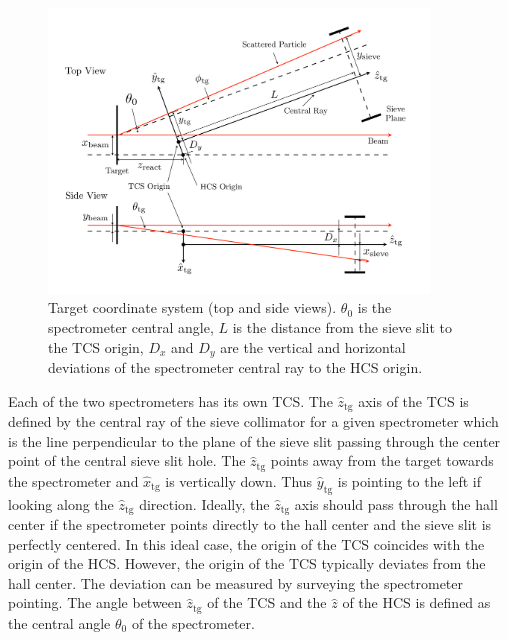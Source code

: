 \begin{figure}[p!]
  \centering
  \includegraphics[width=0.9\textwidth]{figs/TCS.pdf}
  \caption[Target coordinate system.]{Target coordinate system (top and side views). $\theta_0$ is the spectrometer central angle, $L$ is the distance from the sieve slit to the TCS origin, $D_x$ and $D_y$ are the vertical and horizontal deviations of the spectrometer central ray to the HCS origin. \label{C6S1SS2F1}}
\end{figure}

Each of the two spectrometers has its own TCS. The $\hat{z}_{\mathrm{tg}}$ axis of the TCS is defined by the central ray of the sieve collimator for a given spectrometer which is the line perpendicular to the plane of the sieve slit passing through the center point of the central sieve slit hole. The $\hat{z}_{\mathrm{tg}}$ points away from the target towards the spectrometer and $\hat{x}_{\mathrm{tg}}$ is vertically down. Thus $\hat{y}_{\mathrm{tg}}$ is pointing to the left if looking along the $\hat{z}_{\mathrm{tg}}$ direction. Ideally, the $\hat{z}_{\mathrm{tg}}$ axis should pass through the hall center if the spectrometer points directly to the hall center and the sieve slit is perfectly centered. In this ideal case, the origin of the TCS coincides with the origin of the HCS. However, the origin of the TCS typically deviates from the hall center. The deviation can be measured by surveying the spectrometer pointing. The angle between $\hat{z}_{\mathrm{tg}}$ of the TCS and the $\hat{z}$ of the HCS is defined as the central angle $\theta_0$ of the spectrometer.

